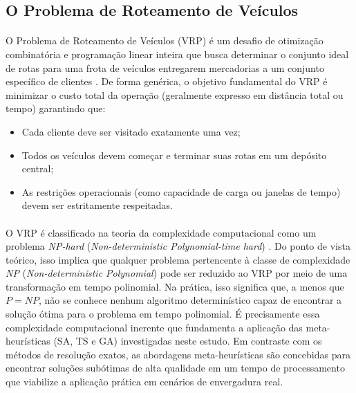 \subsection{O Problema de Roteamento de Veículos}
\label{sec:vrp}

\paragraph{} O Problema de Roteamento de Veículos (VRP) é um desafio de otimização combinatória e programação linear inteira que busca determinar o conjunto ideal de rotas para uma frota de veículos entregarem mercadorias a um conjunto específico de clientes \cite{Dantzig59, Vidal20}. De forma genérica, o objetivo fundamental do VRP é minimizar o custo total da operação (geralmente expresso em distância total ou tempo) garantindo que:

\begin{itemize}
    \item Cada cliente deve ser visitado exatamente uma vez;
    \item Todos os veículos devem começar e terminar suas rotas em um depósito central;
    \item As restrições operacionais (como capacidade de carga ou janelas de tempo) devem ser estritamente respeitadas.
\end{itemize}

\paragraph{} O VRP é classificado na teoria da complexidade computacional como um problema \textit{NP-hard} (\textit{Non-deterministic Polynomial-time hard}) \cite{Garey79}. Do ponto de vista teórico, isso implica que qualquer problema pertencente à classe de complexidade \textit{NP} (\textit{Non-deterministic Polynomial}) pode ser reduzido ao VRP por meio de uma transformação em tempo polinomial. Na prática, isso significa que, a menos que $P = NP$, não se conhece nenhum algoritmo determinístico capaz de encontrar a solução ótima para o problema em tempo polinomial. É precisamente essa complexidade computacional inerente que fundamenta a aplicação das meta-heurísticas (SA, TS e GA) investigadas neste estudo. Em contraste com os métodos de resolução exatos, as abordagens meta-heurísticas são concebidas para encontrar soluções subótimas de alta qualidade em um tempo de processamento que viabilize a aplicação prática em cenários de envergadura real.

